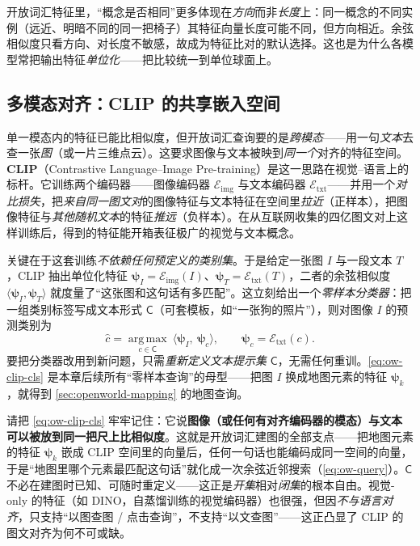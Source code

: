 \begin{note}[为什么是余弦而非欧氏距离]
开放词汇特征里，“概念是否相同”更多体现在\emph{方向}而非\emph{长度}上：同一概念的不同实例（远近、明暗不同的同一把椅子）其特征向量长度可能不同，但方向相近。余弦相似度只看方向、对长度不敏感，故成为特征比对的默认选择。这也是为什么各模型常把输出特征\emph{单位化}——把比较统一到单位球面上。
\end{note}

\subsection{多模态对齐：CLIP 的共享嵌入空间}
\label{sec:openworld-clip}

单一模态内的特征已能比相似度，但开放词汇查询要的是\emph{跨模态}——用一句\emph{文本}去查一张\emph{图}（或一片三维点云）。这要求图像与文本被映到\emph{同一个}对齐的特征空间。\textbf{CLIP}（Contrastive Language--Image Pre-training）是这一思路在视觉–语言上的标杆\cite{radford2021clip}。它训练两个编码器——图像编码器 $\mathcal{E}_{\mathrm{img}}$ 与文本编码器 $\mathcal{E}_{\mathrm{txt}}$——并用一个\emph{对比损失}，把\emph{来自同一图文对}的图像特征与文本特征在空间里\emph{拉近}（正样本），把图像特征与\emph{其他随机文本}的特征\emph{推远}（负样本）。在从互联网收集的四亿图文对上这样训练后，得到的特征能开箱表征极广的视觉与文本概念\cite{radford2021clip}。

关键在于这套训练\emph{不依赖任何预定义的类别集}。于是给定一张图 $I$ 与一段文本 $T$，CLIP 抽出单位化特征 $\boldsymbol\psi_I=\mathcal{E}_{\mathrm{img}}(I)$、$\boldsymbol\psi_T=\mathcal{E}_{\mathrm{txt}}(T)$，二者的余弦相似度 $\langle\boldsymbol\psi_I,\boldsymbol\psi_T\rangle$ 就度量了“这张图和这句话有多匹配”。这立刻给出一个\emph{零样本分类器}：把一组类别标签写成文本形式 $\mathsf{C}$（可套模板，如“一张{狗}的照片”），则对图像 $I$ 的预测类别为
\begin{equation}
  \hat{c}=\operatorname*{arg\,max}_{c\in\mathsf{C}}\ \langle\boldsymbol\psi_I,\ \boldsymbol\psi_c\rangle,\qquad \boldsymbol\psi_c=\mathcal{E}_{\mathrm{txt}}(c).
  \label{eq:ow-clip-cls}
\end{equation}
要把分类器改用到新问题，只需\emph{重新定义文本提示集} $\mathsf{C}$，无需任何重训。\cref{eq:ow-clip-cls} 是本章后续所有“零样本查询”的母型——把图 $I$ 换成地图元素的特征 $\boldsymbol\psi_k$，就得到 \cref{sec:openworld-mapping} 的地图查询。

\begin{insight}
请把 \cref{eq:ow-clip-cls} 牢牢记住：它说\textbf{图像（或任何有对齐编码器的模态）与文本可以被放到同一把尺上比相似度}。这就是开放词汇建图的全部支点——把地图元素的特征 $\boldsymbol\psi_k$ 嵌成 CLIP 空间里的向量后，任何一句话也能编码成同一空间的向量，于是“地图里哪个元素最匹配这句话”就化成一次余弦近邻搜索（\cref{eq:ow-query}）。$\mathsf{C}$ 不必在建图时已知、可随时重定义——这正是\emph{开集}相对\emph{闭集}的根本自由。视觉-only 的特征（如 DINO，自蒸馏训练的视觉编码器）也很强，但因\emph{不与语言对齐}，只支持“以图查图 / 点击查询”，不支持“以文查图”——这正凸显了 CLIP 的图文对齐为何不可或缺。
\end{insight}

